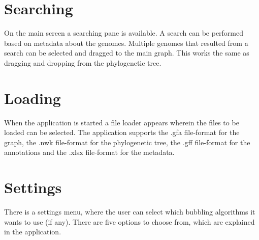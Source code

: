 \section{Searching}
On the main screen a searching pane is available. A search can be performed based on metadata about the genomes. Multiple genomes that resulted from a search can be selected and dragged to the main graph. This works the same as dragging and dropping from the phylogenetic tree.
\section{Loading}
When the application is started a file loader appears wherein the files to be loaded can be selected. The application supports the .gfa file-format for the graph, the .nwk file-format for the phylogenetic tree, the .gff file-format for the annotations and the .xlsx file-format for the metadata. 
\section{Settings}
There is a settings menu, where the user can select which bubbling algorithms it wants to use (if any). There are five options to choose from, which are explained in the application.